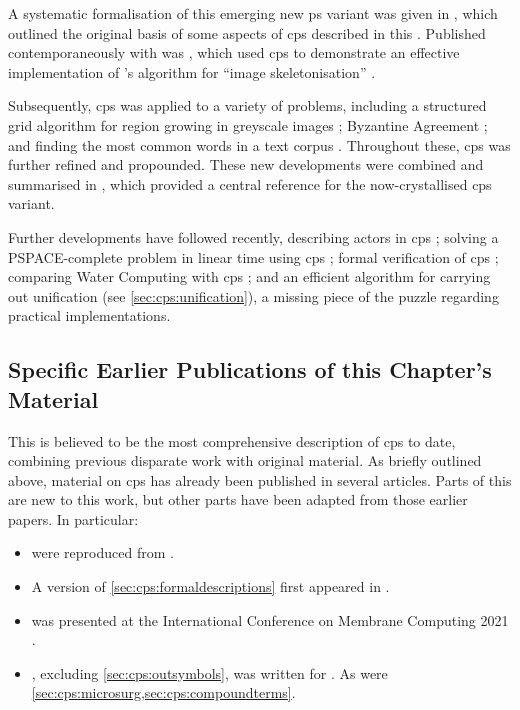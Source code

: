 A systematic formalisation of this emerging new \gls{ps} variant was given in \cite{Nicolescu2014a}, which outlined the original basis of some aspects of \gls{cps} described in this .  Published contemporaneously with \cite{Nicolescu2014a} was \cite{Nicolescu2014}, which used \gls{cps} to demonstrate an effective implementation of \citeauthor{Guo1989}'s algorithm for ``image skeletonisation'' \cite{Guo1989}.

Subsequently, \gls{cps} was applied to a variety of problems, including a structured grid algorithm for region growing in greyscale images \cite{Nicolescu2015}; Byzantine Agreement \cite{Nicolescu2017}; and finding the most common words in a text corpus \cite{Nicolescu2018a}.  Throughout these, \gls{cps} was further refined and propounded.  These new developments were combined and summarised in \cite{Nicolescu2018}, which provided a central reference for the now-crystallised \gls{cps} variant.

Further developments have followed recently, describing \glspl{actor} in \gls{cps} \cite{Henderson2019};  solving a PSPACE-complete problem in linear time using \gls{cps} \cite{Henderson2020}; formal verification of \gls{cps} \cite{Liu2020,Liu2021a}; comparing Water Computing with \gls{cps} \cite{Henderson2021}; and an efficient algorithm for carrying out unification \cite{Liu2021} (see \cref{sec:cps:unification}), a missing piece of the puzzle regarding practical implementations.

\subsection{Specific Earlier Publications of this Chapter's Material}
This  is believed to be the most comprehensive description of \gls{cps} to date, combining previous disparate work with original material.  As briefly outlined above, material on \gls{cps} has already been published in several articles.  Parts of this  are new to this work, but other parts have been adapted from those earlier papers.  In particular:
\begin{itemize}
    \item {} were reproduced from \cite{Cooper2019}.
    \item A version of \cref{sec:cps:formaldescriptions} first appeared in \cite{Cooper2019a}.
    \item {} was presented at the International Conference on Membrane Computing 2021 \cite{Cooper2021a}.
    \item {}, excluding \cref{sec:cps:outsymbols}, was written for \cite{Cooper2022}.  As were \cref{sec:cps:microsurg,sec:cps:compoundterms}.
\end{itemize}

